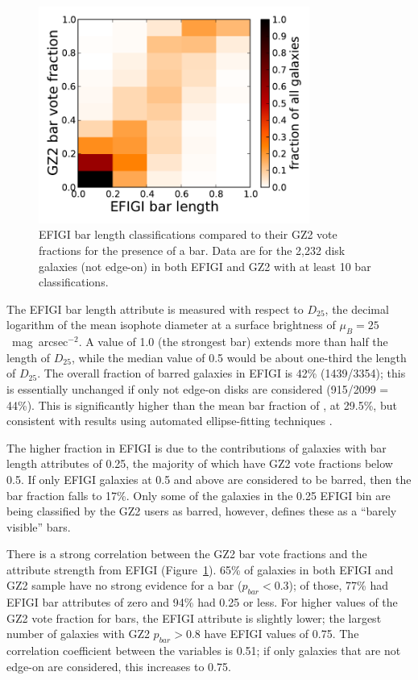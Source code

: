 \documentclass[useAMS,usenatbib]{mn2e}
\begin{document}
\begin{figure}
\includegraphics[angle=0,width=3.5in]{figures/efigi_bars.pdf}
\caption{EFIGI bar length classifications compared to their GZ2 vote fractions for the presence of a bar. Data are for the 2,232 disk galaxies (not edge-on) in both EFIGI and GZ2 with at least 10 bar classifications. 
\label{fig-efigi_bars}}
\end{figure}

The EFIGI bar length attribute is measured with respect to $D_{25}$, the decimal logarithm of the mean isophote diameter at a surface brightness of $\mu_B=25$~mag~arcsec$^{-2}$. A value of 1.0 (the strongest bar) extends more than half the length of $D_{25}$, while the median value of 0.5 would be about one-third the length of $D_{25}$. The overall fraction of barred galaxies in EFIGI is 42\% (1439/3354); this is essentially unchanged if only not edge-on disks are considered (915/2099 = 44\%). This is significantly higher than the mean bar fraction of \citet{mas11c}, at 29.5\%, but consistent with results using automated ellipse-fitting techniques \citep{bar08,agu09}. 

The higher fraction in EFIGI is due to the contributions of galaxies with bar length attributes of 0.25, the majority of which have GZ2 vote fractions below 0.5. If only EFIGI galaxies at 0.5 and above are considered to be barred, then the bar fraction falls to 17\%. Only some of the galaxies in the 0.25 EFIGI bin are being classified by the GZ2 users as barred, however, \citet{bai11} defines these as a ``barely visible'' bars. %

There is a strong correlation between the GZ2 bar vote fractions and the attribute strength from EFIGI (Figure~\ref{fig-efigi_bars}). 65\% of galaxies in both EFIGI and GZ2 sample have no strong evidence for a bar ($p_{bar}<0.3$); of those, 77\% had EFIGI bar attributes of zero and 94\% had 0.25 or less. For higher values of the GZ2 vote fraction for bars, the EFIGI attribute is slightly lower; the largest number of galaxies with GZ2 $p_{bar}>0.8$ have EFIGI values of 0.75. The correlation coefficient between the variables is 0.51; if only galaxies that are not edge-on are considered, this increases to 0.75. 
\end{document}
